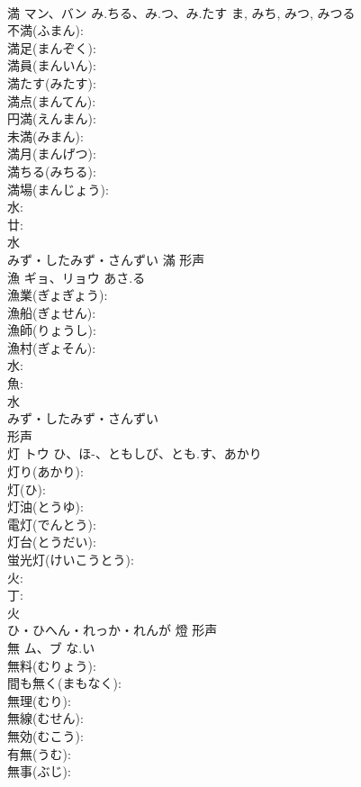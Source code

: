 \documentclass[8pt]{extreport}
\begin{document}
\begin{CJK}{UTF8}{min}
\\	満	マン、バン	み.ちる、み.つ、み.たす	ま, みち, みつ, みつる	
\\	不満(ふまん): 
\\	満足(まんぞく): 
\\	満員(まんいん): 
\\	満たす(みたす): 
\\	満点(まんてん): 
\\	円満(えんまん): 
\\	未満(みまん): 
\\	満月(まんげつ): 
\\	満ちる(みちる): 
\\	満場(まんじょう): 
\\	水: 
\\	廿: 
\\	水	
\\	みず・したみず・さんずい	滿	形声 
\\	漁	ギョ、リョウ	あさ.る		
\\	漁業(ぎょぎょう): 
\\	漁船(ぎょせん): 
\\	漁師(りょうし): 
\\	漁村(ぎょそん): 
\\	水: 
\\	魚: 
\\	水	
\\	みず・したみず・さんずい	
\\	形声 
\\	灯	トウ	ひ、ほ-、ともしび、とも.す、あかり		
\\	灯り(あかり): 
\\	灯(ひ): 
\\	灯油(とうゆ): 
\\	電灯(でんとう): 
\\	灯台(とうだい): 
\\	蛍光灯(けいこうとう): 
\\	火: 
\\	丁: 
\\	火	
\\	ひ・ひへん・れっか・れんが	燈	形声 
\\	無	ム、ブ	な.い		
\\	無料(むりょう): 
\\	間も無く(まもなく): 
\\	無理(むり): 
\\	無線(むせん): 
\\	無効(むこう): 
\\	有無(うむ): 
\\	無事(ぶじ): 

\end{CJK}
\end{document}
